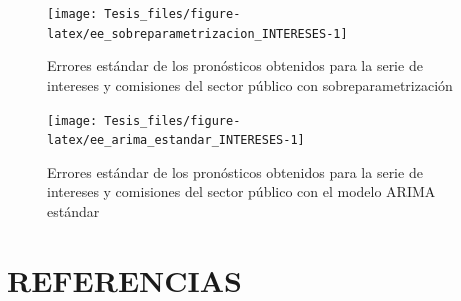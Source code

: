 \documentclass[
]{article}
\begin{document}
\begin{figure}[H]
\texttt{[image: Tesis\_files/figure-latex/ee\_sobreparametrizacion\_INTERESES-1]} \caption{Errores estándar de los pronósticos obtenidos para la serie de intereses y comisiones del sector público con sobreparametrización}\label{fig:ee_sobreparametrizacion_INTERESES}
\end{figure}

\begin{figure}[H]
\texttt{[image: Tesis\_files/figure-latex/ee\_arima\_estandar\_INTERESES-1]} \caption{Errores estándar de los pronósticos obtenidos para la serie de intereses y comisiones del sector público con el modelo ARIMA estándar}\label{fig:ee_arima_estandar_INTERESES}
\end{figure}

\newpage

\section{REFERENCIAS}
\end{document}
